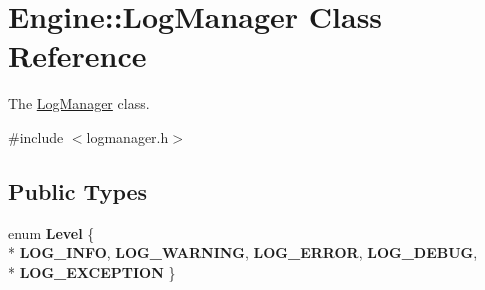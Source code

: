 \hypertarget{classEngine_1_1LogManager}{}\section{Engine\+:\+:Log\+Manager Class Reference}
\label{classEngine_1_1LogManager}


The \hyperlink{classEngine_1_1LogManager}{Log\+Manager} class.  




{\ttfamily \#include $<$logmanager.\+h$>$}

\subsection*{Public Types}
\begin{DoxyCompactItemize}
\item 
\hypertarget{classEngine_1_1LogManager_a540739bc2fa1ac620163c76ebda2c9fe}{}enum {\bfseries Level} \{ \\*
{\bfseries L\+O\+G\+\_\+\+I\+N\+F\+O}, 
{\bfseries L\+O\+G\+\_\+\+W\+A\+R\+N\+I\+N\+G}, 
{\bfseries L\+O\+G\+\_\+\+E\+R\+R\+O\+R}, 
{\bfseries L\+O\+G\+\_\+\+D\+E\+B\+U\+G}, 
\\*
{\bfseries L\+O\+G\+\_\+\+E\+X\+C\+E\+P\+T\+I\+O\+N}
 \}\label{classEngine_1_1LogManager_a540739bc2fa1ac620163c76ebda2c9fe}

\end{DoxyCompactItemize}
